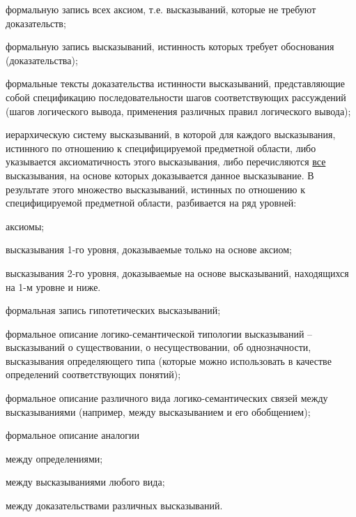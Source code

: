 \begin{SCn}
\begin{scnsubstruct}
{\begin{scnitemize}
\item формальную запись всех аксиом, т.е. высказываний, которые не требуют доказательств;\item формальную запись высказываний, истинность которых требует обоснования (доказательства);\item формальные тексты доказательства истинности высказываний, представляющие собой спецификацию последовательности шагов соответствующих рассуждений (шагов логического вывода, применения различных правил логического вывода);\item иерархическую систему высказываний, в которой для каждого высказывания, истинного по отношению к специфицируемой предметной области, либо указывается аксиоматичность этого высказывания, либо перечисляются \uline{все} высказывания, на основе которых доказывается данное высказывание. В результате этого множество высказываний, истинных по отношению к специфицируемой предметной области, разбивается на ряд уровней:\begin{scnitemizeii}
\item аксиомы;\item высказывания 1-го уровня, доказываемые только на основе аксиом;\item высказывания 2-го уровня, доказываемые на основе высказываний, находящихся на 1-м уровне и ниже.\end{scnitemizeii}
\item формальная запись гипотетических высказываний;\item формальное описание логико-семантической типологии высказываний -- высказываний о существовании, о несуществовании, об однозначности, высказывания определяющего  типа (которые можно использовать в качестве определений соответствующих понятий);\item формальное описание различного вида логико-семантических связей между высказываниями (например, между высказыванием и его обобщением);\item формальное описание аналогии\begin{scnitemizeii}
\item между определениями;\item между высказываниями любого вида;\item между доказательствами различных высказываний.\end{scnitemizeii}
\end{scnitemize}
}
\bigskip
\end{scnsubstruct}
\end{SCn}